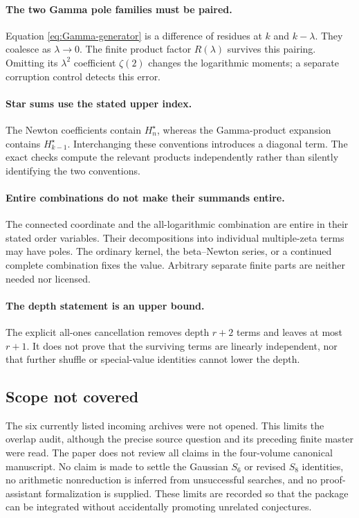 \documentclass[11pt]{article}
\numberwithin{equation}{section}
\theoremstyle{definition}
\begin{document}
\paragraph{The two Gamma pole families must be paired.}
Equation \eqref{eq:Gamma-generator} is a difference of residues at $k$ and $k-\lambda$. They coalesce as $\lambda\to0$. The finite product factor $R(\lambda)$ survives this pairing. Omitting its $\lambda^2$ coefficient $\zeta(2)$ changes the logarithmic moments; a separate corruption control detects this error.

\paragraph{Star sums use the stated upper index.}
The Newton coefficients contain $H_n^\star$, whereas the Gamma-product expansion contains $H_{k-1}^\star$. Interchanging these conventions introduces a diagonal term. The exact checks compute the relevant products independently rather than silently identifying the two conventions.

\paragraph{Entire combinations do not make their summands entire.}
The connected coordinate and the all-logarithmic combination are entire in their stated order variables. Their decompositions into individual multiple-zeta terms may have poles. The ordinary kernel, the beta--Newton series, or a continued complete combination fixes the value. Arbitrary separate finite parts are neither needed nor licensed.

\paragraph{The depth statement is an upper bound.}
The explicit all-ones cancellation removes depth $r+2$ terms and leaves at most $r+1$. It does not prove that the surviving terms are linearly independent, nor that further shuffle or special-value identities cannot lower the depth.

\subsection{Scope not covered}
The six currently listed incoming archives were not opened. This limits the overlap audit, although the precise source question and its preceding finite master were read. The paper does not review all claims in the four-volume canonical manuscript. No claim is made to settle the Gaussian $S_6$ or revised $S_8$ identities, no arithmetic nonreduction is inferred from unsuccessful searches, and no proof-assistant formalization is supplied. These limits are recorded so that the package can be integrated without accidentally promoting unrelated conjectures.
\end{document}
